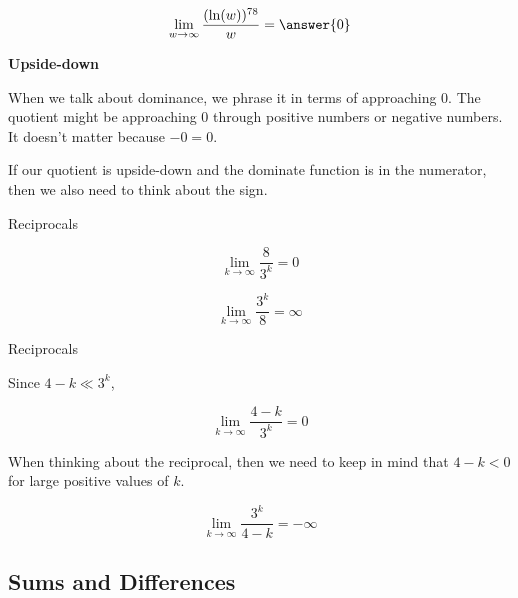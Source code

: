 \documentclass{ximera}
\begin{document}
\begin{question}

\[
\lim\limits_{w \to \infty} \frac{(\ln(w))^{78}}{w} = \answer{0}
\]

\end{question}






\begin{idea} \textbf{\textcolor{blue!55!black}{Upside-down}}


When we talk about dominance, we phrase it in terms of approaching $0$.  The quotient might be approaching $0$ through positive numbers or negative numbers.  It doesn't matter because $-0 = 0$.


If  our quotient is upside-down and the dominate function is in the numerator, then we also need to think about the sign.


\end{idea}



\begin{example} Reciprocals




\[
\lim\limits_{k \to \infty} \frac{8}{3^k} = 0
\]



\[
\lim\limits_{k \to \infty} \frac{3^k}{8} = \infty 
\]




\end{example}









\begin{example} Reciprocals



Since $4 - k \ll 3^k$,

\[
\lim\limits_{k \to \infty} \frac{4 - k}{3^k} = 0
\]


When thinking about the reciprocal, then we need to keep in mind that $4 - k < 0$ for large positive values of $k$.



\[
\lim\limits_{k \to \infty} \frac{3^k}{4 - k} = -\infty 
\]




\end{example}






\subsection*{Sums and Differences}
\end{document}
